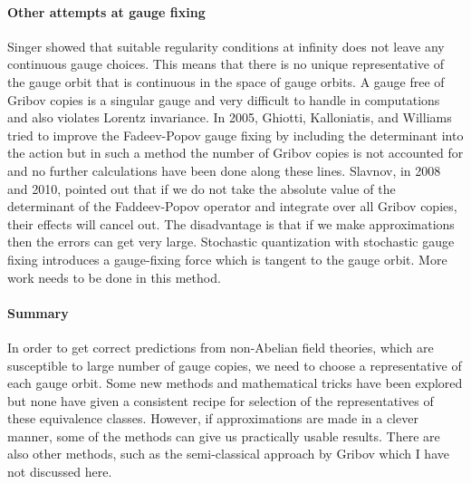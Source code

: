 \paragraph{Other attempts at gauge fixing}
Singer showed that suitable regularity conditions at infinity does not
leave any continuous gauge choices. This means that there is no unique
representative of the gauge orbit that is continuous in the space of
gauge orbits. A gauge free of Gribov copies is a singular gauge and very
difficult to handle in computations and also violates Lorentz
invariance. In 2005, Ghiotti, Kalloniatis, and Williams tried to
improve the Fadeev-Popov gauge fixing by including the determinant into
the action but in such a method the number of Gribov copies is not
accounted for and no further calculations have been done along these
lines. Slavnov, in 2008 and 2010, pointed out that if we do not take
the absolute value of the determinant of the Faddeev-Popov operator and
integrate over all Gribov copies, their effects will cancel out. The
disadvantage is that if we make approximations then the errors can get
very large. Stochastic quantization with stochastic gauge fixing
introduces a gauge-fixing force which is tangent to the gauge orbit. More
work needs to be done in this method.

\paragraph{Summary}
In order to get correct predictions from non-Abelian field theories,
which are susceptible to large number of gauge copies, we need to choose
a representative of each gauge orbit. Some new methods and mathematical
tricks have been explored but none have given a consistent recipe for
selection of the representatives of these equivalence classes. However,
if approximations are made in a clever manner, some of the methods can
give us practically usable results. There are also other methods, such as
the semi-classical approach by Gribov  which I have
not discussed here.



\renewcommand{\ssp}{a}
